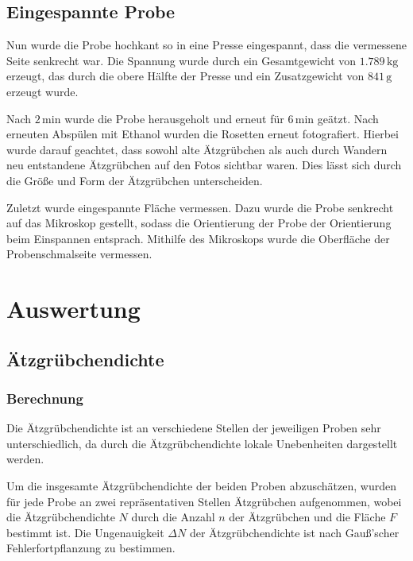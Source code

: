 \documentclass[12pt,a4paper]{scrartcl}
\numberwithin{equation}{section} %
\begin{document}
\hypertarget{eingespannte-probe}{%
\subsection{Eingespannte Probe}\label{eingespannte-probe}}

Nun wurde die Probe hochkant so in eine Presse eingespannt, dass die vermessene Seite senkrecht war. Die Spannung wurde durch ein Gesamtgewicht von $1.789\mathrm{\,kg}$ erzeugt, das durch die obere Hälfte der Presse und ein Zusatzgewicht von $841\mathrm{\,g}$ erzeugt wurde.

Nach $2\mathrm{\,min}$ wurde die Probe herausgeholt und erneut für $6\mathrm{\,min}$ geätzt. Nach erneuten Abspülen mit Ethanol wurden die Rosetten erneut fotografiert. Hierbei wurde darauf geachtet, dass sowohl alte Ätzgrübchen als auch durch Wandern neu entstandene Ätzgrübchen auf den Fotos sichtbar waren. Dies lässt sich durch die Größe und Form der Ätzgrübchen unterscheiden.

Zuletzt wurde eingespannte Fläche vermessen. Dazu wurde die Probe senkrecht auf das Mikroskop gestellt, sodass die Orientierung der Probe der Orientierung beim Einspannen entsprach. Mithilfe des Mikroskops wurde die Oberfläche der Probenschmalseite vermessen.

\clearpage
\hypertarget{auswertung}{%
\section{Auswertung}\label{auswertung}}

\hypertarget{uxe4tzgruxfcbchendichte}{%
\subsection{Ätzgrübchendichte}\label{uxe4tzgruxfcbchendichte}}

\hypertarget{berechnung}{%
\subsubsection{Berechnung}\label{berechnung}}

Die Ätzgrübchendichte ist an verschiedene Stellen der jeweiligen Proben sehr unterschiedlich, da durch die Ätzgrübchendichte lokale Unebenheiten dargestellt werden.

Um die insgesamte Ätzgrübchendichte der beiden Proben abzuschätzen, wurden für jede Probe an zwei repräsentativen Stellen Ätzgrübchen aufgenommen, wobei die Ätzgrübchendichte $N$ durch die Anzahl $n$ der Ätzgrübchen und die Fläche $F$ bestimmt ist. Die Ungenauigkeit $\Delta N$ der Ätzgrübchendichte ist nach Gauß'scher Fehlerfortpflanzung zu bestimmen.
\end{document}
